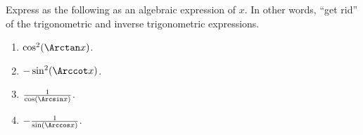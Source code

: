 Express as the following as an algebraic expression of $x$. In other words, ``get rid'' of the trigonometric and inverse trigonometric expressions.

\begin{multicols}{2}
\begin{enumerate}[ref={\fcProblemRef}]
\item $\cos^2(\Arctan x)$. 

\item \label{problem-sin^2(arccot x) } $-\sin^2(\Arccot x)$. 

\item $\frac{1}{\cos(\Arcsin x)}$. 

\item $-\frac{1}{\sin(\Arccos x)}$.

\end{enumerate}
\end{multicols}
